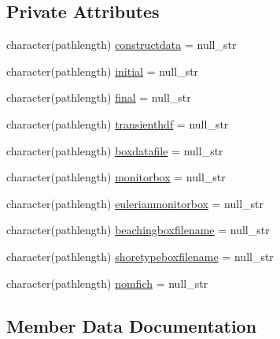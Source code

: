 \subsection*{Private Attributes}
\begin{DoxyCompactItemize}
\item 
character(pathlength) \mbox{\hyperlink{structmodulelagrangianglobal_1_1t__files_a62a5155495779006b53c3fb5cdd5ce7b}{constructdata}} = null\+\_\+str
\item 
character(pathlength) \mbox{\hyperlink{structmodulelagrangianglobal_1_1t__files_a98391889fee21c7bb62ff04245fbfd3d}{initial}} = null\+\_\+str
\item 
character(pathlength) \mbox{\hyperlink{structmodulelagrangianglobal_1_1t__files_a8725be4eb6a04dbc4fdc1ac2dfe84a50}{final}} = null\+\_\+str
\item 
character(pathlength) \mbox{\hyperlink{structmodulelagrangianglobal_1_1t__files_a222c12eb1525968068aa0834c79ed065}{transienthdf}} = null\+\_\+str
\item 
character(pathlength) \mbox{\hyperlink{structmodulelagrangianglobal_1_1t__files_aee3cc548a7a2fb17f7221b1b67534762}{boxdatafile}} = null\+\_\+str
\item 
character(pathlength) \mbox{\hyperlink{structmodulelagrangianglobal_1_1t__files_a1d12bd45d2a2a1e757bde73cad6394b9}{monitorbox}} = null\+\_\+str
\item 
character(pathlength) \mbox{\hyperlink{structmodulelagrangianglobal_1_1t__files_a5d298572153b5bbeca5de32062bdc85e}{eulerianmonitorbox}} = null\+\_\+str
\item 
character(pathlength) \mbox{\hyperlink{structmodulelagrangianglobal_1_1t__files_a470fddc9e15982bf018ff0141caca8f6}{beachingboxfilename}} = null\+\_\+str
\item 
character(pathlength) \mbox{\hyperlink{structmodulelagrangianglobal_1_1t__files_ad68a9e2105f1cadced0d121d72661b61}{shoretypeboxfilename}} = null\+\_\+str
\item 
character(pathlength) \mbox{\hyperlink{structmodulelagrangianglobal_1_1t__files_ac8a891617df7074686bf0b857452141a}{nomfich}} = null\+\_\+str
\end{DoxyCompactItemize}


\subsection{Member Data Documentation}
\mbox{\label{structmodulelagrangianglobal_1_1t__files_a470fddc9e15982bf018ff0141caca8f6}} 
